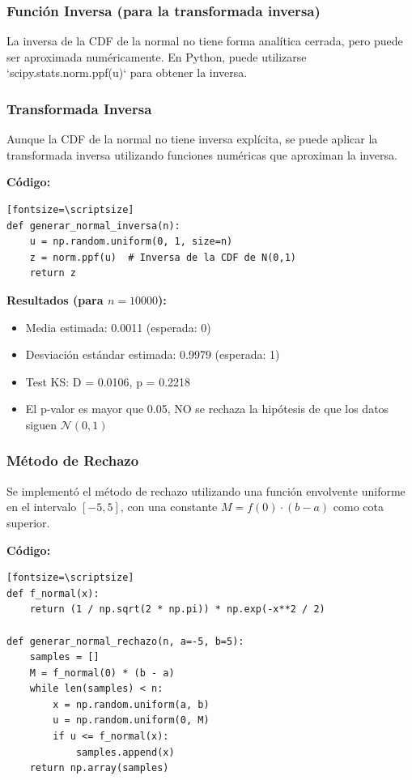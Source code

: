 \documentclass{article}
\begin{document}
\subsubsection*{Función Inversa (para la transformada inversa)}
La inversa de la CDF de la normal no tiene forma analítica cerrada, pero puede ser aproximada numéricamente. En Python, puede utilizarse `scipy.stats.norm.ppf(u)` para obtener la inversa.

\subsubsection{Transformada Inversa}
Aunque la CDF de la normal no tiene inversa explícita, se puede aplicar la transformada inversa utilizando funciones numéricas que aproximan la inversa.

\textbf{Código:}
\begin{verbatim}[fontsize=\scriptsize]
def generar_normal_inversa(n):
    u = np.random.uniform(0, 1, size=n)
    z = norm.ppf(u)  # Inversa de la CDF de N(0,1)
    return z
\end{verbatim}

\textbf{Resultados (para $n=10000$):}
\begin{itemize}
    \item Media estimada: 0.0011 (esperada: 0)
    \item Desviación estándar estimada: 0.9979 (esperada: 1)
    \item Test KS: D = 0.0106, p = 0.2218
    \item El p-valor es mayor que 0.05, NO se rechaza la hipótesis de que los datos siguen $\mathcal{N}(0,1)$
\end{itemize}

\vspace{0.5em}
\subsubsection{Método de Rechazo}
Se implementó el método de rechazo utilizando una función envolvente uniforme en el intervalo $[-5, 5]$, con una constante $M = f(0) \cdot (b-a)$ como cota superior.

\textbf{Código:}
\begin{verbatim}[fontsize=\scriptsize]
def f_normal(x):
    return (1 / np.sqrt(2 * np.pi)) * np.exp(-x**2 / 2)

def generar_normal_rechazo(n, a=-5, b=5):
    samples = []
    M = f_normal(0) * (b - a)
    while len(samples) < n:
        x = np.random.uniform(a, b)
        u = np.random.uniform(0, M)
        if u <= f_normal(x):
            samples.append(x)
    return np.array(samples)
\end{verbatim}
\end{document}
